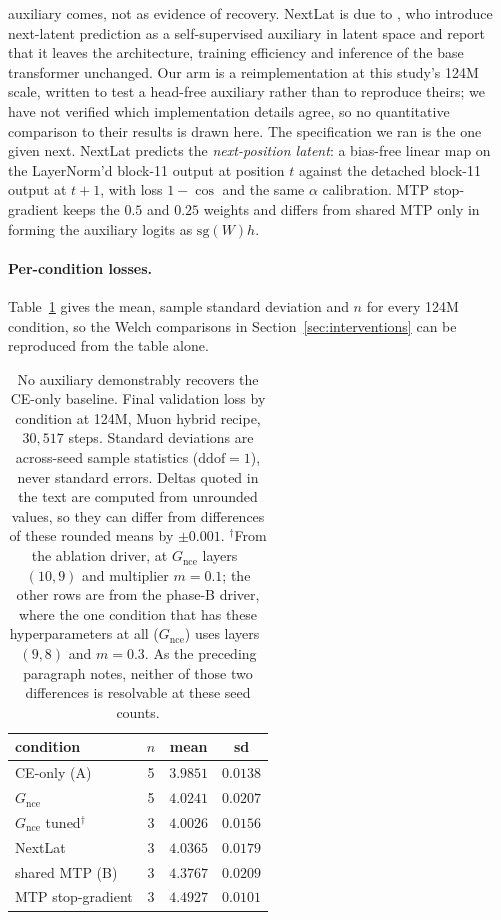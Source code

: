 auxiliary comes, not as evidence of recovery. NextLat is due to \citet{teoh2025nextlat}, who introduce
next-latent prediction as a self-supervised auxiliary in latent space and
report that it leaves the architecture, training efficiency and inference of
the base transformer unchanged. Our arm is a reimplementation at this study's
124M scale, written to test a head-free auxiliary rather than to reproduce
theirs; we have not verified which implementation details agree, so no
quantitative comparison to their results is drawn here. The specification we
ran is the one given next.
NextLat predicts the
\emph{next-position latent}: a bias-free linear map on the LayerNorm'd block-11 output
at position $t$ against the detached block-11 output at $t{+}1$, with loss
$1-\cos$ and the same $\alpha$ calibration. MTP stop-gradient keeps the $0.5$ and
$0.25$ weights and differs from shared MTP only in forming the auxiliary logits as
$\mathrm{sg}(W)h$.

\paragraph{Per-condition losses.} Table~\ref{tab:conditions} gives the mean, sample
standard deviation and $n$ for every 124M condition, so the Welch comparisons in
Section~\ref{sec:interventions} can be reproduced from the table alone.

\begin{table}[t]
\centering
\small
\begin{tabular}{lccc}
\toprule
condition & $n$ & mean & sd \\
\midrule
CE-only (A)                 & 5 & $3.9851$ & $0.0138$ \\
$G_{\text{nce}}$            & 5 & $4.0241$ & $0.0207$ \\
$G_{\text{nce}}$ tuned$^{\dagger}$ & 3 & $4.0026$ & $0.0156$ \\
NextLat                     & 3 & $4.0365$ & $0.0179$ \\
shared MTP (B)              & 3 & $4.3767$ & $0.0209$ \\
MTP stop-gradient           & 3 & $4.4927$ & $0.0101$ \\
\bottomrule
\end{tabular}
\caption{No auxiliary demonstrably recovers the CE-only baseline. Final validation loss by condition at 124M, Muon hybrid recipe, $30{,}517$ steps. Standard deviations are across-seed sample statistics ($\mathrm{ddof}{=}1$),
never standard errors. Deltas quoted in the text are computed from unrounded values,
so they can differ from differences of these rounded means by $\pm0.001$.
$^{\dagger}$From the ablation driver, at $G_{\text{nce}}$ layers~$(10,9)$ and
multiplier $m{=}0.1$; the other rows are from the phase-B driver, where the one
condition that has these hyperparameters at all ($G_{\text{nce}}$) uses layers~$(9,8)$
and $m{=}0.3$. As the preceding paragraph notes, neither of those two differences is
resolvable at these seed counts.}
\label{tab:conditions}
\end{table}

